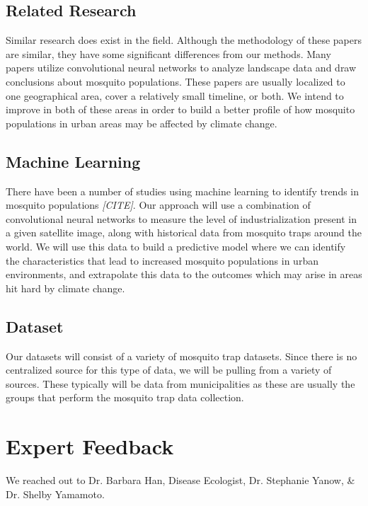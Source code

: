 \documentclass[11pt]{article}
\begin{document}
\subsection{Related Research}
Similar research does exist in the field. Although the methodology of these papers are similar, they have some significant differences from our methods. Many papers utilize convolutional neural networks to analyze landscape data and draw conclusions about mosquito populations. These papers are usually localized to one geographical area, cover a relatively small timeline, or both. We intend to improve in both of these areas in order to build a better profile of how mosquito populations in urban areas may be affected by climate change.

\subsection{Machine Learning}
There have been a number of studies using machine learning to identify trends in mosquito populations \textit{[CITE]}. Our approach will use a combination of convolutional neural networks to measure the level of industrialization present in a given satellite image, along with historical data from mosquito traps around the world. We will use this data to build a predictive model where we can identify the characteristics that lead to increased mosquito populations in urban environments, and extrapolate this data to the outcomes which may arise in areas hit hard by climate change.


\subsection{Dataset}
Our datasets will consist of a variety of mosquito trap datasets. Since there is no centralized source for this type of data, we will be pulling from a variety of sources. These typically will be data from municipalities as these are usually the groups that perform the mosquito trap data collection.

\section{Expert Feedback}
We reached out to Dr. Barbara Han, Disease Ecologist, Dr. Stephanie Yanow, \& Dr. Shelby Yamamoto.
\end{document}
